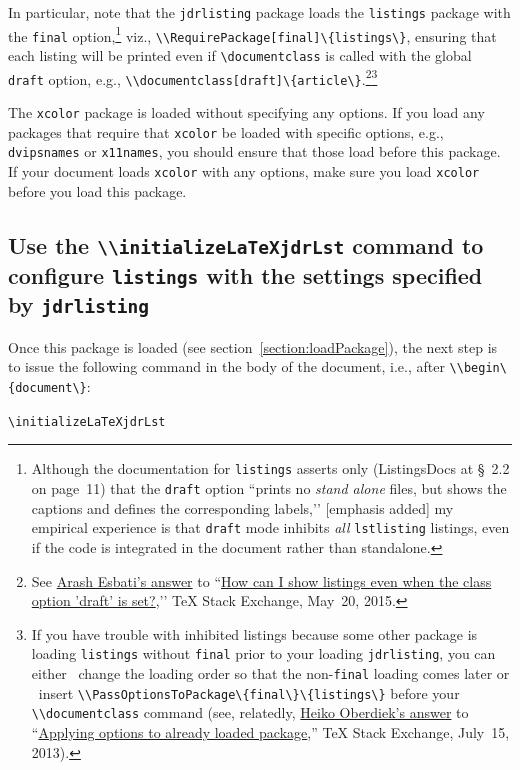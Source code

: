 \documentclass[12pt,table,final]{article}%
\begin{document}
In particular, note that the \lstinline|jdrlisting| package loads the \lstinline|listings| package with the \lstinline|final| option,\footnote{Although the documentation for \lstinline|listings| asserts only (ListingsDocs at §~2.2 on page~11) that the \lstinline|draft| option ``prints no \emph{stand alone} files, but shows the captions and defines the corresponding labels,’’ [emphasis added] my empirical experience is that \lstinline|draft| mode inhibits \emph{all} \lstinline|lstlisting| listings, even if the code is integrated in the document rather than standalone.} viz., \mbox{\lstinline|\\RequirePackage[final]\{listings\}|,} ensuring that each listing will be printed even if \lstinline|\documentclass| is called with the global \lstinline|draft| option, e.g., \mbox{\lstinline|\\documentclass[draft]\{article\}|.}\footnote{See \href{https://tex.stackexchange.com/a/246059/7922}{Arash Esbati's answer} to ``\href{https://tex.stackexchange.com/questions/246057/how-can-i-show-listings-even-when-the-class-option-draft-is-set}{How can I show listings even when the class option 'draft' is set?},’’ \TeX{} Stack Exchange, May~20, 2015.}\footnote{If you have trouble with inhibited listings because some other package is loading \lstinline|listings| without \lstinline|final| prior to your loading \lstinline|jdrlisting|, you can either ~change the loading order so that the non-\lstinline|final| loading comes later or ~insert \lstinline|\\PassOptionsToPackage\{final\}\{listings\}| before your \lstinline|\\documentclass| command (see, relatedly, \href{https://tex.stackexchange.com/a/124052/7922}{Heiko Oberdiek's answer} to ``\href{https://tex.stackexchange.com/questions/124049/applying-options-to-already-loaded-package}{Applying options to already loaded package},'' \TeX{} Stack Exchange, July~15, 2013).}

The \lstinline|xcolor| package is loaded without specifying any options. If you load any packages that require that \lstinline|xcolor| be loaded with specific options, e.g., \lstinline|dvipsnames| or \lstinline|x11names|, you should ensure that those load before this package. If your document loads \lstinline|xcolor| with any options, make sure you load \lstinline|xcolor| before you load this package.

\subsection{Use the \lstinline|\\initializeLaTeXjdrLst| command to configure \lstinline|listings| with the settings specified by \lstinline|jdrlisting|}
\label{section:initializePackage}
Once this package is loaded (see section~\ref{section:loadPackage}), the next step is to issue the following command in the body of the document, i.e., after \mbox{\lstinline|\\begin\{document\}|}:
\begin{jdrCodeSnip}
\lstinline|\initializeLaTeXjdrLst|
\end{jdrCodeSnip}
\end{document}
